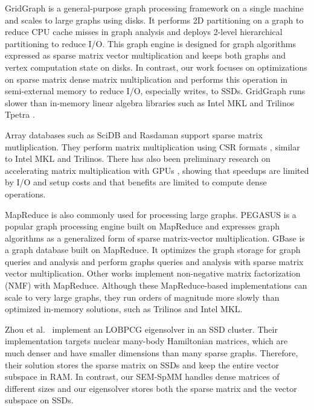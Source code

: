 GridGraph \cite{gridgraph} is a general-purpose graph processing framework on
a single machine
and scales to large graphs using disks. It performs 2D partitioning on a graph
to reduce CPU cache misses in graph analysis and deploys 2-level hierarchical
partitioning to reduce I/O. This graph engine is designed for graph
algorithms expressed as sparse matrix vector multiplication and keeps both
graphs and vertex computation state on disks. In contrast, our work focuses on
optimizations on sparse matrix dense matrix multiplication and performs this
operation in semi-external memory to reduce I/O, especially writes,
to SSDs. GridGraph runs slower than in-memory linear algebra libraries
such as Intel MKL \cite{mkl} and Trilinos Tpetra \cite{trilinos}.

Array databases such as SciDB \cite{scidb} and Rasdaman \cite{rasdaman} support
sparse matrix mutliplication. They perform matrix multiplication using CSR
formats \cite{SLACID}, similar to Intel MKL and Trilinos.  There has also been
preliminary research on accelerating matrix multiplication with GPUs \cite{Liu14},
showing that speedups are limited by I/O and setup costs and that benefits
are limited to compute dense operations.


MapReduce \cite{MapReduce} is also commonly used for processing large graphs.
PEGASUS \cite{pegasus} is a popular graph processing engine built on MapReduce
and expresses graph algorithms as a generalized form of sparse matrix-vector
multiplication. GBase \cite{gbase} is a graph database built on MapReduce.
It optimizes the graph storage for graph queries and analysis and perform graphs
queries and analysis with sparse matrix vector multiplication.
Other works \cite{Liao14, Yin14, Liu10} implement non-negative matrix
factorization (NMF) with MapReduce. Although these MapReduce-based
implementations can scale to very large graphs, they run orders of
magnitude more slowly than optimized in-memory solutions, such as Trilinos and Intel MKL.

Zhou et al.~\cite{Zhou12} implement an LOBPCG \cite{Arbenz05} eigensolver in
an SSD cluster. Their implementation targets nuclear many-body Hamiltonian
matrices, which are much denser and have smaller dimensions than many sparse
graphs. Therefore, their solution stores the sparse matrix on SSDs and keep
the entire vector subspace in RAM. In contrast, our SEM-SpMM handles dense
matrices of different sizes and our eigensolver stores both the sparse matrix
and the vector subspace on SSDs.

